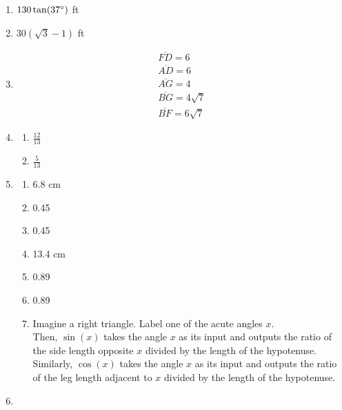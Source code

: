 \documentclass{article}
\begin{document}
\begin{enumerate}
\item $130\tan(37\degree)$ ft

\item $30(\sqrt{3} - 1)$ ft

\item \begin{gather*}
	\overline{FD} = 6 \\
	\overline{AD} = 6 \\
	\overline{AG} = 4 \\
	\overline{BG} = 4\sqrt{7} \\
	\overline{BF} = 6\sqrt{7}
	\end{gather*}
	
\item

	\begin{enumerate}
	
	\item $\frac{12}{13}$
	
	\item $\frac{5}{13}$
	
	\end{enumerate}
	
\item

	\begin{enumerate}
	
	\item 6.8 cm
	
	\item 0.45
	
	\item 0.45
	
	\item 13.4 cm
	
	\item 0.89
	
	\item 0.89
	
	\item Imagine a right triangle. Label one of the acute angles $x$.\\
	Then, $\sin(x)$ takes the angle $x$ as its input and outputs the ratio of the side length opposite $x$ divided by the length of the hypotenuse.\\
	Similarly, $\cos(x)$ takes the angle $x$ as its input and outputs the ratio of the leg length adjacent to $x$ divided by the length of the hypotenuse.
	
	\end{enumerate}
	
\item \phantom{x}


\end{enumerate}
\end{document}
